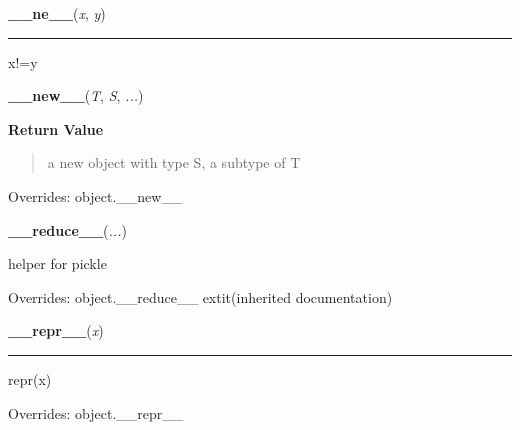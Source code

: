 \hspace{.8\funcindent}\begin{boxedminipage}{\funcwidth}

    \raggedright \textbf{\_\_ne\_\_}(\textit{x}, \textit{y})

    \vspace{-1.5ex}

    \rule{\textwidth}{0.5\fboxrule}
\setlength{\parskip}{2ex}
    x!=y

\setlength{\parskip}{1ex}
    \end{boxedminipage}

    \vspace{0.5ex}

\hspace{.8\funcindent}\begin{boxedminipage}{\funcwidth}

    \raggedright \textbf{\_\_new\_\_}(\textit{T}, \textit{S}, \textit{...})

\setlength{\parskip}{2ex}
\setlength{\parskip}{1ex}
      \textbf{Return Value}
    \vspace{-1ex}

      \begin{quote}
      a new object with type S, a subtype of T

      \end{quote}

      Overrides: object.\_\_new\_\_

    \end{boxedminipage}

    \vspace{0.5ex}

\hspace{.8\funcindent}\begin{boxedminipage}{\funcwidth}

    \raggedright \textbf{\_\_reduce\_\_}(\textit{...})

\setlength{\parskip}{2ex}
    helper for pickle

\setlength{\parskip}{1ex}
      Overrides: object.\_\_reduce\_\_ 	extit{(inherited documentation)}

    \end{boxedminipage}

    \vspace{0.5ex}

\hspace{.8\funcindent}\begin{boxedminipage}{\funcwidth}

    \raggedright \textbf{\_\_repr\_\_}(\textit{x})

    \vspace{-1.5ex}

    \rule{\textwidth}{0.5\fboxrule}
\setlength{\parskip}{2ex}
    repr(x)

\setlength{\parskip}{1ex}
      Overrides: object.\_\_repr\_\_

    \end{boxedminipage}

